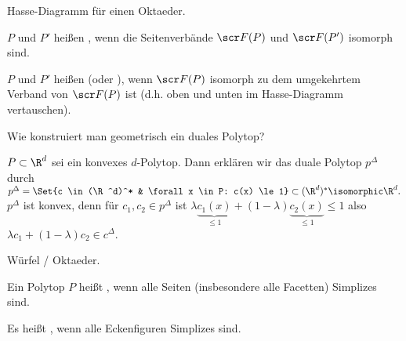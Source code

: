 \begin{ex}
    Hasse-Diagramm für einen Oktaeder.
\end{ex}

\begin{df}
    $P$ und $P'$ heißen , wenn die Seitenverbände $\scr F(P)$ und $\scr F(P')$ isomorph sind.

    $P$ und $P'$ heißen  (oder ), wenn $\scr F(P)$ isomorph zu dem umgekehrtem Verband von $\scr F(P)$ ist (d.h. oben und unten im Hasse-Diagramm vertauschen).
\end{df}

Wie konstruiert man geometrisch ein duales Polytop?

\begin{df}
    $P \subset \R^d$ sei ein konvexes $d$-Polytop.
    Dann erklären wir das duale Polytop $p^\Delta$ durch
    \begin{math}
        p^\Delta = \Set{c \in (\R^d)^* & \forall x \in P: c(x) \le 1}
        \subset (\R^d)^* \isomorphic \R^d.
    \end{math}
    $p^\Delta$ ist konvex, denn für $c_1, c_2 \in p^\Delta$ ist
    \begin{math}
        \lambda \underbrace{c_1(x)}_{\le 1} + (1-\lambda)\underbrace{c_2(x)}_{\le 1} \le 1
    \end{math}
    also $\lambda c_1 + (1-\lambda) c_2 \in c^\Delta$.
\end{df}

\begin{ex}
    Würfel / Oktaeder.
\end{ex}

\begin{df}
    Ein Polytop $P$ heißt , wenn alle Seiten (insbesondere alle Facetten) Simplizes sind.

    Es heißt , wenn alle Eckenfiguren Simplizes sind.
\end{df}


